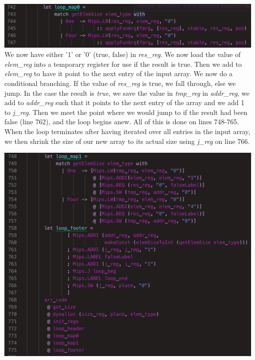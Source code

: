 \includegraphics[width=\linewidth]{Materials/CodeGen/filter1}
We now have either '1' or '0' (true, false) in \textit{res\_reg}. We now load the value of \textit{elem\_reg} into a temporary register for use if the result is true. Then we add to \textit{elem\_reg} to have it point to the next entry of the input array. We now do a conditional branching. If the value of \textit{res\_reg} is true, we fall through, else we jump. In the case the result is \textit{true}, we save the value in \textit{tmp\_reg} in \textit{addr\_reg}, we add to \textit{addr\_reg} such that it points to the next entry of the array and we add 1 to \textit{j\_reg}. Then we meet the point where we would jump to if the result had been false (line 762), and the loop begins anew. All of this is done on lines 748-765. When the loop terminates after having iterated over all entries in the input array, we then shrink the size of our new array to its actual size using \textit{j\_reg} on line 766.

\includegraphics[width=\linewidth]{Materials/CodeGen/filter2}
